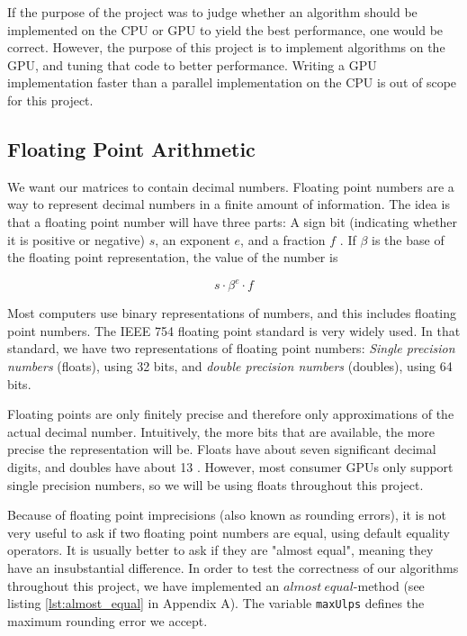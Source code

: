 If the purpose of the project was to judge whether an algorithm should be implemented on the CPU or GPU to yield the best performance, one would be correct. However, the purpose of this project is to implement algorithms on the GPU, and tuning that code to better performance. Writing a GPU implementation faster than a parallel implementation on the CPU is out of scope for this project.

\subsection{Floating Point Arithmetic}

We want our matrices to contain decimal numbers. Floating point numbers are a way to represent decimal numbers in a finite amount of information. The idea is that a floating point number will have three parts: A sign bit (indicating whether it is positive or negative) $s$, an exponent $e$, and a fraction $f$ \cite[Sect. 6]{afternotes}. If $\beta$ is the base of the floating point representation, the value of the number is

\[s \cdot \beta^e \cdot f\]

Most computers use binary representations of numbers, and this includes floating point numbers. The IEEE 754 floating point standard is very widely used. In that standard, we have two representations of floating point numbers: \textit{Single precision numbers} (floats), using 32 bits, and \textit{double precision numbers} (doubles), using 64 bits. 

Floating points are only finitely precise and therefore only approximations of the actual decimal number. Intuitively, the more bits that are available, the more precise the representation will be. Floats have about seven significant decimal digits, and doubles have about 13 \cite[Sect. 6]{afternotes}. However, most consumer GPUs only support single precision numbers, so we will be using floats throughout this project.

Because of floating point imprecisions (also known as rounding errors), it is not very useful to ask if two floating point numbers are equal, using default equality operators. It is usually better to ask if they are "almost equal", meaning they have an insubstantial difference. In order to test the correctness of our algorithms throughout this project, we have implemented an $almost\ equal$-method (see listing \ref{lst:almost_equal} in Appendix A). The variable \texttt{maxUlps} defines the maximum rounding error we accept.

